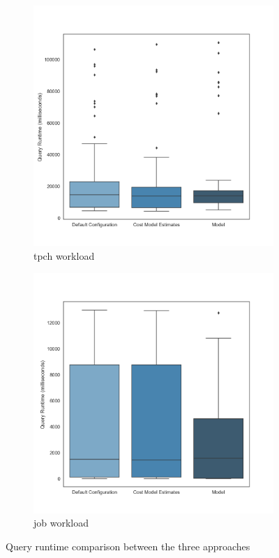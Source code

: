 \begin{figure}[H]
    \begin{subfigure}[t]{0.5\textwidth}
    \includegraphics[width=\textwidth]{img/performance_evaluation/tpch_rf_optimizer_comparison.png}
    \caption{\gls{tpch} workload}
    \label{fig:tpch_boxplot}
    \end{subfigure}\hfill
    \begin{subfigure}[t]{0.5\textwidth}
    \includegraphics[width=\textwidth]{img/performance_evaluation/job_rf_optimizer_comparison.png}
    \caption{\gls{job} workload}
    \label{fig:job_boxplot}
    \end{subfigure}
    \caption{Query runtime comparison between the three approaches} 
    \label{fig:boxplot}
\end{figure}

